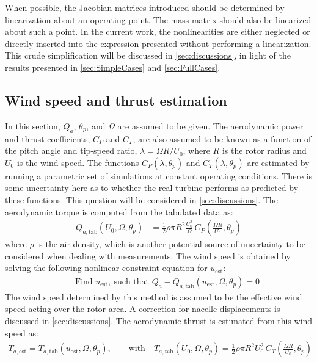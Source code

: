 \documentclass[wes, manuscript]{copernicus}
\begin{document}
When possible, the Jacobian matrices introduced should be determined by linearization about an operating point. The mass matrix should also be linearized about such a point.
In the current work, the nonlinearities are either neglected or directly inserted into the expression presented without performing a linearization.
This crude simplification will be discussed in \autoref{sec:discussions}, in light of the results presented in \autoref{sec:SimpleCases} and \autoref{sec:FullCases}.

    





\subsection{Wind speed and thrust estimation}
\label{sec:WSEst}
In this section, $Q_a$, $\theta_p$, and $\Omega$ are assumed to be given.
The aerodynamic power and thrust coefficients, $C_P$ and $C_T$, are also assumed to be known as a function of the pitch angle and tip-speed ratio, $\lambda=\Omega R/U_0$, where $R$ is the rotor radius and $U_0$ is the wind speed.
The functions $C_P(\lambda, \theta_p)$ and $C_T(\lambda, \theta_p)$ are estimated by running a parametric set of simulations at constant operating conditions. There is some uncertainty here as to whether the real turbine performs as predicted by these functions. This question will be considered in \autoref{sec:discussions}.
The aerodynamic torque is computed from the tabulated data as:
\begin{align}
    Q_{a,\text{tab}}\left(U_0,\Omega,\theta_p\right) &= \frac{1}{2} \rho \pi R^2 \frac{U_0^3}{\Omega}\, C_P\left(\frac{\Omega R}{U_0}, \theta_p\right)
 \label{eq:QaTab}
\end{align}
where $\rho$ is the air density, which is another potential source of uncertainty to be considered when dealing with measurements.
The wind speed is obtained by solving the following nonlinear constraint equation for $u_\text{est}$:
\begin{align}
\qquad \text{Find } u_\text{est},~\text{such that }
 Q_a - Q_{a,\text{tab}}\left(u_\text{est},\Omega,\theta_p\right) =0
     \label{eq:TorqueMinimization}
\end{align}
The wind speed determined by this method is assumed to be the effective wind speed acting over the rotor area. A correction for nacelle displacements is discussed in \autoref{sec:discussions}.
The aerodynamic thrust is estimated from this wind speed as:
\begin{align}
T_{a,\text{est}} = 
   T_{a,\text{tab}} \left(u_\text{est},\Omega,\theta_p\right)
,\qquad \text{with} \quad
   T_{a,\text{tab}}\left(U_0,\Omega,\theta_p\right)
 = \frac{1}{2} \rho \pi R^2 U_0^2\, C_T\left( \frac{\Omega R}{U_0}, \theta_p \right)
 \label{eq:TaTab}
\end{align}
\end{document}
